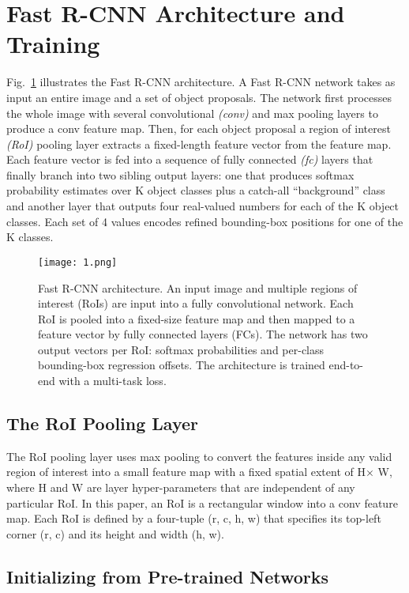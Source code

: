 \documentclass[10pt,twocolumn,letterpaper]{article}
\begin{document}
\section{Fast R-CNN Architecture and Training}

Fig.~\ref{p1} illustrates the Fast R-CNN architecture. A Fast R-CNN network takes as input an entire image and a set of object proposals. The network first processes the whole image with several convolutional \emph{(conv)} and max pooling layers to produce a conv feature map. Then, for each object proposal a region of interest \emph{(RoI)} pooling layer extracts a fixed-length feature vector from the feature map. Each feature vector is fed into a sequence of fully connected \emph{(fc)} layers that finally branch into two sibling output layers: one that produces softmax probability estimates over K object classes plus a catch-all ``background'' class and another layer that outputs four real-valued numbers for each of the K object classes. Each set of 4 values encodes refined bounding-box positions for one of the K classes.
\begin{figure}
	\begin{center}
		\texttt{[image: 1.png]}
	\end{center}
	\caption{Fast R-CNN architecture. An input image and multiple regions of interest (RoIs) are input into a fully convolutional network. Each RoI is pooled into a fixed-size feature map and then mapped to a feature vector by fully connected layers (FCs). The network has two output vectors per RoI: softmax probabilities and per-class bounding-box regression offsets. The architecture is trained end-to-end with a multi-task loss.}
	\label{p1}
\end{figure}

\subsection{The RoI Pooling Layer}

The RoI pooling layer uses max pooling to convert the features inside any valid region of interest into a small feature map with a fixed spatial extent of H$\times$ W, where H and W are layer hyper-parameters that are independent of any particular RoI. In this paper, an RoI is a rectangular window into a conv feature map. Each RoI is defined by a four-tuple (r, c, h, w) that specifies its top-left corner (r, c) and its height and width (h, w).

\subsection{Initializing from Pre-trained Networks}
\end{document}
